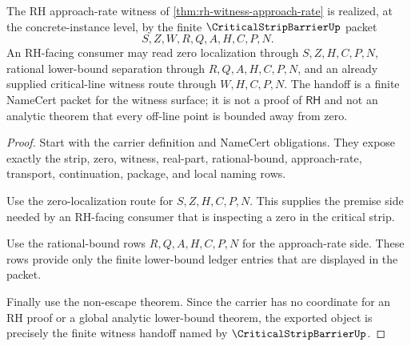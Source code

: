 \begin{theorem}
\label{thm:critical-strip-barrier-rh-witness-handoff}
The RH approach-rate witness of \autoref{thm:rh-witness-approach-rate} is realized, at the concrete-instance level, by the finite $\CriticalStripBarrierUp$ packet
$$
S,Z,W,R,Q,A,H,C,P,N.
$$
An RH-facing consumer may read zero localization through $S,Z,H,C,P,N$, rational lower-bound separation through $R,Q,A,H,C,P,N$, and an already supplied critical-line witness route through $W,H,C,P,N$. The handoff is a finite NameCert packet for the witness surface; it is not a proof of $\mathsf{RH}$ and not an analytic theorem that every off-line point is bounded away from zero.
\end{theorem}
\begin{proof}
Start with the carrier definition and NameCert obligations. They expose exactly the strip, zero, witness, real-part, rational-bound, approach-rate, transport, continuation, package, and local naming rows.

Use the zero-localization route for $S,Z,H,C,P,N$. This supplies the premise side needed by an RH-facing consumer that is inspecting a zero in the critical strip.

Use the rational-bound rows $R,Q,A,H,C,P,N$ for the approach-rate side. These rows provide only the finite lower-bound ledger entries that are displayed in the packet.

Finally use the non-escape theorem. Since the carrier has no coordinate for an RH proof or a global analytic lower-bound theorem, the exported object is precisely the finite witness handoff named by $\CriticalStripBarrierUp$.
\end{proof}

\begin{closurestatus}{\CriticalStripBarrierUp}
  \theoryclosure{\seedClosure}
  \formalstatus{\unformalizedV}
\end{closurestatus}
